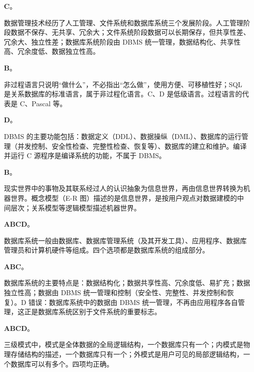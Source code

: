 \documentclass[a4paper,11pt]{article}
\begin{document}
\q \textbf{C}。\begin{analysis}数据管理技术经历了人工管理、文件系统和数据库系统三个发展阶段。人工管理阶段数据不保存、无共享、冗余大；文件系统阶段数据可以长期保存，但共享性差、冗余大、独立性差；数据库系统阶段由 DBMS 统一管理，数据结构化、共享性高、冗余度低、数据独立性高。\end{analysis}

\q \textbf{B}。\begin{analysis}非过程语言只说明“做什么”，不必指出“怎么做”，使用方便、可移植性好；SQL 是关系数据库的标准语言，属于非过程化语言。C、D 是低级语言。过程语言的代表是 C、Pascal 等。\end{analysis}

\q \textbf{D}。\begin{analysis}DBMS 的主要功能包括：数据定义（DDL）、数据操纵（DML）、数据库的运行管理（并发控制、安全性检查、完整性检查、恢复等）、数据库的建立和维护。编译并运行 C 源程序是编译系统的功能，不属于 DBMS。\end{analysis}

\q \textbf{B}。\begin{analysis}现实世界中的事物及其联系经过人的认识抽象为信息世界，再由信息世界转换为机器世界。概念模型（E-R 图）描述的是信息世界，是按用户观点对数据建模的中间层次；关系模型等逻辑模型描述机器世界。\end{analysis}


\q \textbf{ABCD}。\begin{analysis}数据库系统一般由数据库、数据库管理系统（及其开发工具）、应用程序、数据库管理员和计算机硬件等组成。四个选项都是数据库系统的组成部分。\end{analysis}

\q \textbf{ABC}。\begin{analysis}数据库系统的主要特点是：数据结构化；数据共享性高、冗余度低、易扩充；数据独立性高；数据由 DBMS 统一管理和控制（安全性、完整性、并发控制和恢复）。D 错误：数据库系统中的数据由 DBMS 统一管理，不再由应用程序各自管理，这正是数据库系统区别于文件系统的重要标志。\end{analysis}

\q \textbf{ABCD}。\begin{analysis}三级模式中，模式是全体数据的全局逻辑结构，一个数据库只有一个；内模式是物理存储结构的描述，一个数据库只有一个；外模式是用户可见的局部逻辑结构，一个数据库可以有多个。四项均正确。\end{analysis}
\end{document}

